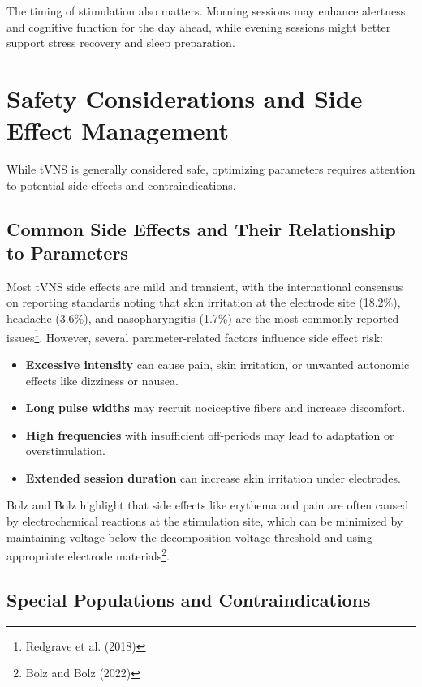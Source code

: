 \documentclass[
  Letterpaper,
]{scrbook}
\providecommand{\tightlist}{%
  \setlength{\itemsep}{0pt}\setlength{\parskip}{0pt}}\usepackage{longtable,booktabs,array}
\begin{document}
The timing of stimulation also matters. Morning sessions may enhance
alertness and cognitive function for the day ahead, while evening
sessions might better support stress recovery and sleep preparation.

\section{Safety Considerations and Side Effect
Management}\label{safety-considerations-and-side-effect-management}

While tVNS is generally considered safe, optimizing parameters requires
attention to potential side effects and contraindications.

\subsection{Common Side Effects and Their Relationship to
Parameters}\label{common-side-effects-and-their-relationship-to-parameters}

Most tVNS side effects are mild and transient, with the international
consensus on reporting standards noting that skin irritation at the
electrode site (18.2\%), headache (3.6\%), and nasopharyngitis (1.7\%)
are the most commonly reported issues\footnote{Redgrave et al. (2018)}.
However, several parameter-related factors influence side effect risk:

\begin{itemize}
\tightlist
\item
  \textbf{Excessive intensity} can cause pain, skin irritation, or
  unwanted autonomic effects like dizziness or nausea.
\item
  \textbf{Long pulse widths} may recruit nociceptive fibers and increase
  discomfort.
\item
  \textbf{High frequencies} with insufficient off-periods may lead to
  adaptation or overstimulation.
\item
  \textbf{Extended session duration} can increase skin irritation under
  electrodes.
\end{itemize}

Bolz and Bolz highlight that side effects like erythema and pain are
often caused by electrochemical reactions at the stimulation site, which
can be minimized by maintaining voltage below the decomposition voltage
threshold and using appropriate electrode materials\footnote{Bolz and
  Bolz (2022)}.

\subsection{Special Populations and
Contraindications}\label{special-populations-and-contraindications}
\end{document}
